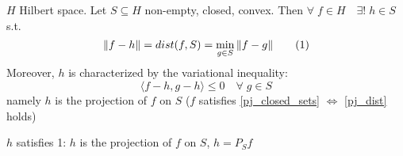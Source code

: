 \begin{theorem}
    \(H\) Hilbert space. Let \(S \subseteq H\) non-empty, closed, convex. Then \(\forall \; f \in H \quad \exists! \; h \in S\) s.t. 
        \begin{equation}\label{pj_closed_sets}
            \norm{f-h} = dist (f, S) = \min_{g \in S} \norm{f-g} \tag{1}
        \end{equation}
    Moreover, \(h\) is characterized by the variational inequality:
        \begin{equation}\label{pj_dist}
            \langle f-h, g-h \rangle \leq 0 \quad \forall \; g \in S \tag*{*}
        \end{equation}
    namely \(h\) is the projection of \(f \) on \(S\) (\(f\) satisfies \eqref{pj_closed_sets} \(\Leftrightarrow\) \eqref{pj_dist} holds)
\end{theorem}
\begin{remark}
    \(h\) satisfies 1: \(h\) is the projection of \(f\) on \(S\), \(h = P_S f\)
\end{remark}
